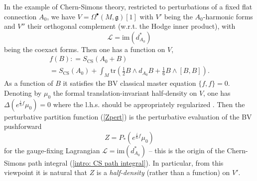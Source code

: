 \documentclass[11pt,a4paper]{amsart}
\theoremstyle{plain} %
\theoremstyle{definition}
\theoremstyle{remark}
\newcommand{\g}{\mathfrak{g}}
\newcommand{\mr}{\mathrm}
\newcommand{\bt}{\bullet}
\newcommand{\mc}{\mathcal}
\begin{document}
In the example of Chern-Simons theory, restricted to perturbations of a fixed flat connection $A_0$, we have $V=\Omega^\bt(M,\g)[1]$ with $V'$ being the $A_0$-harmonic forms and $V''$ their orthogonal complement (w.r.t. the Hodge inner product), with 
\begin{equation}\label{intro L=im(d^*_A0)}
\mc{L}=\mr{im}(d^*_{A_0})
\end{equation}
being the coexact forms. Then one has a function on $V$,
\begin{multline}\label{intro S_CS(S_0+B)}
    f(B)\colon=S_\mr{CS}(A_0+B)\\
    =S_\mr{CS}(A_0)+\int_M\mr{tr}\left(\frac12 B\wedge d_{A_0} B+\frac16 B\wedge [B,B]\right).
\end{multline}
As a function of $B$ it satisfies the BV classical master equation $\{f,f\}=0$. Denoting by $\mu_0$ the formal translation-invariant half-density on $V$,  one has 
$\Delta (e^{\frac{i}{\hbar}f}\mu_0 )=0$ where the l.h.s. should be appropriately regularized \cite{Costello2011}. Then the perturbative partition function (\ref{Zpert}) is the perturbative evaluation of the BV pushforward
\begin{equation}\label{intro BV pushforward}
    Z= P_*\left(e^{\frac{i}{\hbar}f}\mu_0\right)
\end{equation}
for the gauge-fixing Lagrangian $\mc{L} = \mr{im}(d^*_{A_0})$ -- this is the origin of the Chern-Simons path integral (\ref{intro: CS path integral}).
In particular, from this viewpoint it is natural that $ Z$ is a \emph{half-density} (rather than a function) on $V'$.
\end{document}
